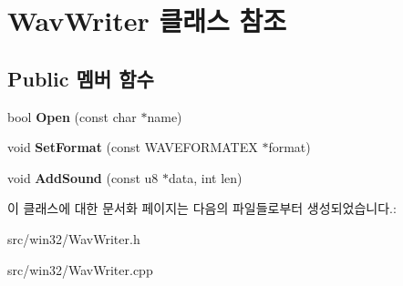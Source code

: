 \hypertarget{class_wav_writer}{}\section{Wav\+Writer 클래스 참조}
\label{class_wav_writer}
\subsection*{Public 멤버 함수}
\begin{DoxyCompactItemize}
\item 
\mbox{\label{class_wav_writer_a18a057d0c1901caa6b08f528bd6908a7}} 
bool {\bfseries Open} (const char $\ast$name)
\item 
\mbox{\label{class_wav_writer_a04fe7187eebeff2831af0bc85470744d}} 
void {\bfseries Set\+Format} (const W\+A\+V\+E\+F\+O\+R\+M\+A\+T\+EX $\ast$format)
\item 
\mbox{\label{class_wav_writer_a2033f614c70ac3e59d07fb43ea26577a}} 
void {\bfseries Add\+Sound} (const u8 $\ast$data, int len)
\end{DoxyCompactItemize}


이 클래스에 대한 문서화 페이지는 다음의 파일들로부터 생성되었습니다.\+:\begin{DoxyCompactItemize}
\item 
src/win32/Wav\+Writer.\+h\item 
src/win32/Wav\+Writer.\+cpp\end{DoxyCompactItemize}
